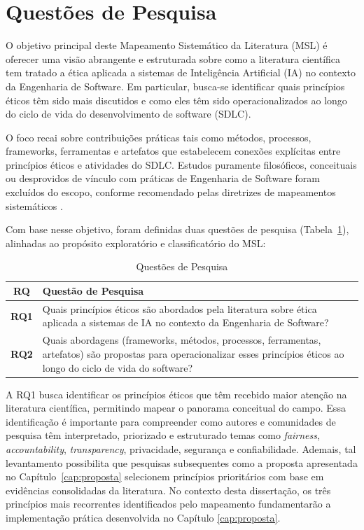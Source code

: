 \section{Questões de Pesquisa}

O objetivo principal deste Mapeamento Sistemático da Literatura (MSL) é oferecer uma visão abrangente e estruturada sobre como a literatura científica tem tratado a ética aplicada a sistemas de Inteligência Artificial (IA) no contexto da Engenharia de Software. Em particular, busca-se identificar quais princípios éticos têm sido mais discutidos e como eles têm sido operacionalizados ao longo do ciclo de vida do desenvolvimento de software (SDLC). 

O foco recai sobre contribuições práticas tais como métodos, processos, frameworks, ferramentas e artefatos que estabelecem conexões explícitas entre princípios éticos e atividades do SDLC. Estudos puramente filosóficos, conceituais ou desprovidos de vínculo com práticas de Engenharia de Software foram excluídos do escopo, conforme recomendado pelas diretrizes de mapeamentos sistemáticos \cite{Petersen2015}.

Com base nesse objetivo, foram definidas duas questões de pesquisa (Tabela~\ref{tab:research-questions}), alinhadas ao propósito exploratório e classificatório do MSL:

\begin{table}[htb!]
  \centering
  \caption{Questões de Pesquisa}
  \label{tab:research-questions}
  \footnotesize
  \begin{tabular}{|c|p{14.2cm}|}
    \hline
    \textbf{RQ} & \textbf{Questão de Pesquisa} \\
    \hline
    \textbf{RQ1} & Quais princípios éticos são abordados pela literatura sobre ética aplicada a sistemas de IA no contexto da Engenharia de Software? \\
    \hline
    \textbf{RQ2} & Quais abordagens (frameworks, métodos, processos, ferramentas, artefatos) são propostas para operacionalizar esses princípios éticos ao longo do ciclo de vida do software? \\
    \hline
  \end{tabular}
\end{table}

A RQ1 busca identificar os princípios éticos que têm recebido maior atenção na literatura científica, permitindo mapear o panorama conceitual do campo. Essa identificação é importante para compreender como autores e comunidades de pesquisa têm interpretado, priorizado e estruturado temas como \textit{fairness}, \textit{accountability}, \textit{transparency}, privacidade, segurança e confiabilidade. Ademais, tal levantamento possibilita que pesquisas subsequentes como a proposta apresentada no Capítulo~\ref{cap:proposta} selecionem princípios prioritários com base em evidências consolidadas da literatura. No contexto desta dissertação, os três princípios mais recorrentes identificados pelo mapeamento fundamentarão a implementação prática desenvolvida no Capítulo \ref{cap:proposta}.


